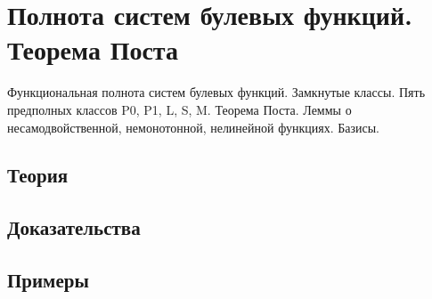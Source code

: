 
\section{Полнота систем булевых функций. Теорема Поста}
\label{sec:2.3a.02-post-completeness}

\begin{ticket}
Функциональная полнота систем булевых функций. Замкнутые классы. Пять предполных классов P0, P1, L, S, M. Теорема Поста. Леммы о несамодвойственной, немонотонной, нелинейной функциях. Базисы.
\end{ticket}

\subsection*{Теория}

\subsection*{Доказательства}

\subsection*{Примеры}
